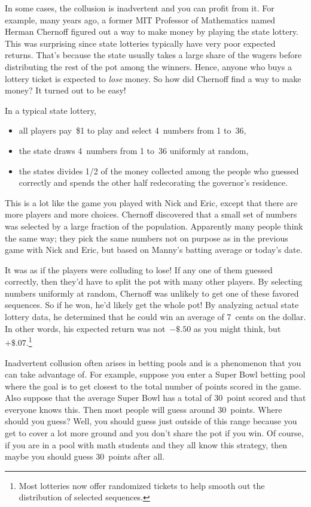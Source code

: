 In some cases, the collusion is inadvertent and you can profit
from it.  For example, many years ago, a former MIT Professor of
Mathematics named Herman Chernoff figured out a way to make money by
playing the state lottery.  This was surprising since state lotteries
typically have very poor expected returns.  That's because the state
usually takes a large share of the wagers before distributing the rest
of the pot among the winners.  Hence, anyone who buys a lottery ticket
is expected to \emph{lose} money.  So how did Chernoff find a way to
make money?  It turned out to be easy!

In a typical state lottery,
\begin{itemize}

\item all players pay~\$1 to play and select 4~numbers from 1 to~36,

\item the state draws 4~numbers from 1 to~36 uniformly at random,

\item the states divides 1/2 of the money collected among the people
  who guessed correctly and spends the other half redecorating the
  governor's residence.

\end{itemize}
This is a lot like the game you played with Nick and Eric, except that
there are more players and more choices.  Chernoff discovered that a
small set of numbers was selected by a large fraction of the
population.  Apparently many people think the same way; they pick the
same numbers not on purpose as in the previous game with Nick and
Eric, but based on Manny's batting average or today's date.

It was as if the players were colluding to lose!  If any one of them
guessed correctly, then they'd have to split the pot with many other
players.  By selecting numbers uniformly at random, Chernoff was
unlikely to get one of these favored sequences.  So if he won, he'd
likely get the whole pot!  By analyzing actual state lottery data, he
determined that he could win an average of 7~cents on the dollar.  In
other words, his expected return was not~$-\${.}50$ as you might
think, but~$+\${.}07$.\footnote{Most lotteries now offer randomized
  tickets to help smooth out the distribution of selected sequences.}

Inadvertent collusion often arises in betting pools and is a
phenomenon that you can take advantage of.  For example, suppose you
enter a Super Bowl betting pool where the goal is to get closest to
the total number of points scored in the game.  Also suppose that the
average Super Bowl has a total of 30~point scored and that everyone
knows this.  Then most people will guess around 30~points.  Where
should you guess?  Well, you should guess just outside of this range
because you get to cover a lot more ground and you don't share the pot
if you win.  Of course, if you are in a pool with math students and
they all know this strategy, then maybe you should guess 30~points
after all.

